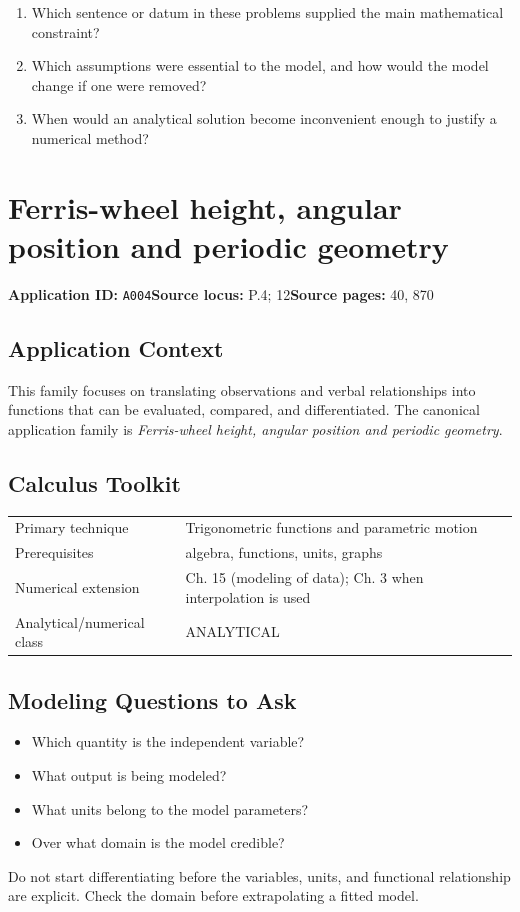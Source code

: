 \documentclass[11pt]{book}
\newcommand{\pid}[1]{\texttt{#1}}
\begin{document}
\begin{reflectionbox}\begin{enumerate}
\item Which sentence or datum in these problems supplied the main mathematical constraint?
\item Which assumptions were essential to the model, and how would the model change if one were removed?
\item When would an analytical solution become inconvenient enough to justify a numerical method?
\end{enumerate}\end{reflectionbox}
\chapter{Ferris-wheel height, angular position and periodic geometry}\label{app:A004}
\textbf{Application ID:} \pid{A004}\quad \textbf{Source locus:} P.4; 12\quad \textbf{Source pages:} 40, 870
\section*{Application Context}
This family focuses on translating observations and verbal relationships into functions that can be evaluated, compared, and differentiated. The canonical application family is \emph{Ferris-wheel height, angular position and periodic geometry}.
\section*{Calculus Toolkit}
\begin{tabularx}{\textwidth}{@{}lX@{}}\toprule
Primary technique & Trigonometric functions and parametric motion \\
Prerequisites & algebra, functions, units, graphs \\
Numerical extension & Ch. 15 (modeling of data); Ch. 3 when interpolation is used \\
Analytical/numerical class & ANALYTICAL \\
\bottomrule\end{tabularx}
\section*{Modeling Questions to Ask}\begin{itemize}
\item Which quantity is the independent variable?
\item What output is being modeled?
\item What units belong to the model parameters?
\item Over what domain is the model credible?
\end{itemize}
\begin{errorbox}Do not start differentiating before the variables, units, and functional relationship are explicit. Check the domain before extrapolating a fitted model.\end{errorbox}
\end{document}
